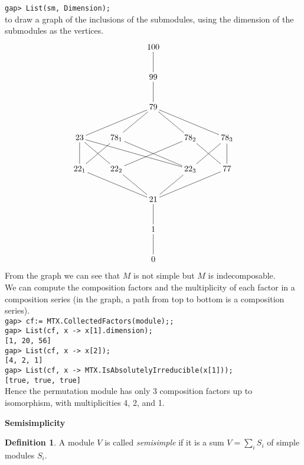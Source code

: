 \documentclass[12pt]{amsart}
\theoremstyle{definition}
\newtheorem{definition}[theorem]{Definition}
\begin{document}
\verb"gap> List(sm, Dimension);"\\
to draw a graph of the inclusions of the submodules, using the dimension of the submodules as the vertices.
$$\xymatrix{ && 100 \ar@{-}[d] \\
&& 99 \ar@{-}[d] \\
&& 79 \ar@{-}[dll] \ar@{-}[dl] \ar@{-}[dr] \ar@{-}[drr] \\
23 \ar@{-}[d] \ar@{-}[dr] \ar@{-}[drrr] & 78_1 \ar@{-}[dl] \ar@{-}[drr] && 78_2 \ar@{-}[dll] \ar@{-}[dr] & 78_3 \ar@{-}[dl] \ar@{-}[d]\\
22_1 \ar@{-}[drr] & 22_2 \ar@{-}[dr] && 22_3 \ar@{-}[dl] & 77 \ar@{-}[dll] \\
&& 21 \ar@{-}[d] \\
&& 1 \ar@{-}[d] \\
&& 0}$$
From the graph we can see that $M$ is  not simple but $M$ is indecomposable.\\
We can compute the composition factors and the multiplicity of each factor in a composition series (in the graph, a path from top to bottom is a composition series).\\
\verb"gap> cf:= MTX.CollectedFactors(module);;"\\
\verb"gap> List(cf, x -> x[1].dimension);"\\
\verb"[1, 20, 56]"\\
\verb"gap> List(cf, x -> x[2]);"\\
\verb"[4, 2, 1]"\\
\verb"gap> List(cf, x -> MTX.IsAbsolutelyIrreducible(x[1]));"\\
\verb"[true, true, true]"\\
Hence the permutation module has only 3 composition factors up to isomorphism, with multiplicities 4, 2, and 1.

\begin{center}
\textbf{Semisimplicity}
\end{center}

\begin{definition}
A module $V$ is called \emph{semisimple} if it is a sum $V=\sum_i S_i$ of simple modules $S_i$.
\end{definition}

\nocite{*}




\end{document}
